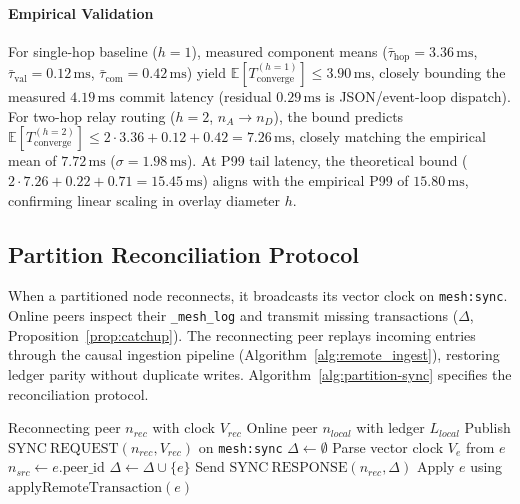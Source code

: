\paragraph{Empirical Validation}
For single-hop baseline ($h=1$), measured component means ($\bar{\tau}_{\text{hop}} = 3.36\,\text{ms}$, $\bar{\tau}_{\text{val}} = 0.12\,\text{ms}$, $\bar{\tau}_{\text{com}} = 0.42\,\text{ms}$) yield $\mathbb{E}[T_{\text{converge}}^{(h=1)}] \leq 3.90\,\text{ms}$, closely bounding the measured $4.19\,\text{ms}$ commit latency (residual $0.29\,\text{ms}$ is JSON/event-loop dispatch). For two-hop relay routing ($h=2$, $n_A \to n_D$), the bound predicts $\mathbb{E}[T_{\text{converge}}^{(h=2)}] \leq 2 \cdot 3.36 + 0.12 + 0.42 = 7.26\,\text{ms}$, closely matching the empirical mean of $7.72\,\text{ms}$ ($\sigma = 1.98\,\text{ms}$). At P99 tail latency, the theoretical bound ($2 \cdot 7.26 + 0.22 + 0.71 = 15.45\,\text{ms}$) aligns with the empirical P99 of $15.80\,\text{ms}$, confirming linear scaling in overlay diameter $h$.

\subsection{Partition Reconciliation Protocol}
When a partitioned node reconnects, it broadcasts its vector clock on \texttt{mesh:sync}. Online peers inspect their \texttt{\_mesh\_log} and transmit missing transactions ($\Delta$, Proposition~\ref{prop:catchup}). The reconnecting peer replays incoming entries through the causal ingestion pipeline (Algorithm~\ref{alg:remote_ingest}), restoring ledger parity without duplicate writes. Algorithm~\ref{alg:partition-sync} specifies the reconciliation protocol.

\begin{algorithm}[!t]
\caption{Partition Synchronization and Catch-Up}
\label{alg:partition-sync}
\begin{algorithmic}[1]
\Require Reconnecting peer $n_{rec}$ with clock $V_{rec}$
\Require Online peer $n_{local}$ with ledger $L_{local}$
\State Publish $\mathrm{SYNC\ REQUEST}(n_{rec},V_{rec})$
       on \texttt{mesh:sync}
\State $\Delta \gets \emptyset$
    \State Parse vector clock $V_e$ from $e$
    \State $n_{src} \gets e.\mathrm{peer\_id}$
        \State $\Delta \gets \Delta \cup \{e\}$
    \EndIf
\EndFor
\State Send $\mathrm{SYNC\ RESPONSE}(n_{rec},\Delta)$
    \State Apply $e$ using
           $\mathrm{applyRemoteTransaction}(e)$
\EndFor
\end{algorithmic}
\end{algorithm}


